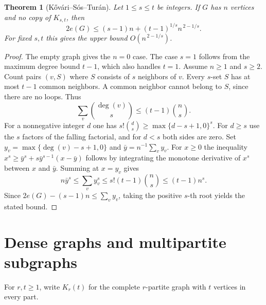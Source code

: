 \documentclass[11pt,oneside,openany]{book}
\theoremstyle{plain}
\newtheorem{theorem}{Theorem}[chapter]
\theoremstyle{definition}
\theoremstyle{remark}
\begin{document}
\begin{theorem}[K\H{o}v\'ari--S\'os--Tur\'an]\label{p205:W02}
Let \(1\le s\le t\) be integers. If \(G\) has \(n\) vertices and no
copy of \(K_{s,t}\), then
\[
  2e(G)\le (s-1)n+(t-1)^{1/s}n^{\,2-1/s}.
\]
For fixed \(s,t\) this gives the upper bound \(O(n^{\,2-1/s})\).
\end{theorem}
\begin{proof}
The empty graph gives the \(n=0\) case. The case \(s=1\) follows
from the maximum degree bound \(t-1\), which also handles \(t=1\).
Assume \(n\ge1\) and \(s\ge2\). Count pairs \((v,S)\) where \(S\)
consists of \(s\) neighbors of \(v\). Every \(s\)-set \(S\) has at
most \(t-1\) common neighbors. A common neighbor cannot belong to
\(S\), since there are no loops. Thus
\[
  \sum_v\binom{\deg(v)}s\le(t-1)\binom ns.
\]
For a nonnegative integer \(d\) one has
\(s!\binom ds\ge \max\{d-s+1,0\}^s\). For \(d\ge s\) use the \(s\)
factors of the falling factorial, and for \(d<s\) both sides are
zero. Set \(y_v=\max\{\deg(v)-s+1,0\}\) and
\(\bar y=n^{-1}\sum_v y_v\). For \(x\ge0\) the inequality
\(x^s\ge \bar y^s+s\bar y^{s-1}(x-\bar y)\) follows by integrating
the monotone derivative of \(x^s\) between \(x\) and \(\bar y\).
Summing at \(x=y_v\) gives
\[
 n\bar y^s\le\sum_v y_v^s\le s!(t-1)\binom ns\le (t-1)n^s.
\]
Since \(2e(G)-(s-1)n\le \sum_v y_v\), taking the positive \(s\)-th
root yields the stated bound.
\end{proof}

\section{Dense graphs and multipartite subgraphs}

For \(r,t\ge1\), write \(K_r(t)\) for the complete \(r\)-partite
graph with \(t\) vertices in every part.
\end{document}
